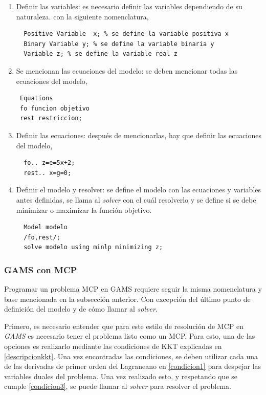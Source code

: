 \begin{enumerate}
   \item Definir las variables: es necesario definir las variables dependiendo de su naturaleza. con la siguiente nomenclatura,
   \begin{lstlisting}
  Positive Variable  x; % se define la variable positiva x
  Binary Variable y; % se define la variable binaria y
  Variable z; % se define la variable real z
   \end{lstlisting}
   \item Se mencionan las ecuaciones del modelo: se deben mencionar todas las ecuaciones del modelo, 
   \begin{lstlisting}
 Equations
 fo funcion objetivo
 rest restriccion;
  \end{lstlisting}
  \item Definir las ecuaciones: después de mencionarlas, hay que definir las ecuaciones del modelo,
  \begin{lstlisting}
  fo.. z=e=5x+2;
  rest.. x=g=0;
  \end{lstlisting}
  
  \item  Definir el modelo y resolver: se define el modelo con las ecuaciones y variables antes definidas, se llama al \textit{solver} con el cuál resolverlo y se define si se debe minimizar o maximizar la función objetivo. 
  \begin{lstlisting}
  Model modelo
  /fo,rest/;
  solve modelo using minlp minimizing z;
  \end{lstlisting}
\end{enumerate}


\subsubsection{GAMS con MCP}

Programar un problema MCP en GAMS requiere seguir la misma nomenclatura y base mencionada en la subsección anterior. Con excepción del último punto de definición del modelo y de cómo llamar al \textit{solver}. 
\vspace{2.5mm}

Primero, es necesario entender que para este estilo de resolución de MCP en \textit{GAMS} es necesario tener el problema listo como un MCP. Para esto, una de las opciones es realizarlo mediante las condiciones de KKT explicadas en \ref{descripcionkkt}. Una vez encontradas las condiciones, se deben utilizar cada una de las derivadas de primer orden del Lagraneano en \ref{condicion1} para despejar las variables duales del problema. Una vez realizado esto, y respetando que se cumple \ref{condicion3}, se puede llamar al \textit{solver} para resolver el problema. 
\vspace{2.5mm}

